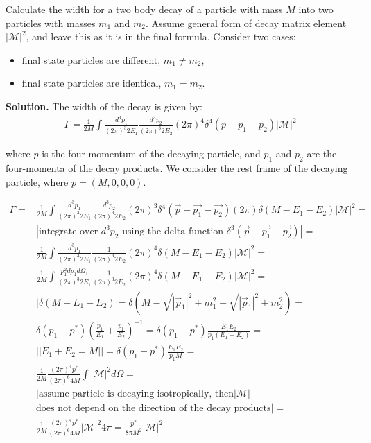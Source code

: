 \documentclass[11pt,a4paper]{article}
\newenvironment{solution}{\vspace{1cm} \par\textbf{Solution.} \vspace{1cm}}{\newpage}
\begin{document}
Calculate the width for a two body decay of a particle with mass $M$ into two 
particles with masses $m_1$ and $m_2$. Assume general form of decay matrix element 
$|\mathcal{M}|^2$, and leave this as it is in the final formula. 
Consider two cases:
\begin{itemize}
  \item final state particles are different, $m_1 \neq m_2$,
  \item final state particles are identical, $m_1 = m_2$.
\end{itemize}

\begin{solution}
  The width of the decay is given by:
  \begin{align*}
    \Gamma = \frac{1}{2M} \int \frac{d^3p_1}{(2\pi)^3 2E_1} \frac{d^3p_2}{(2\pi)^3 2E_2} (2\pi)^4 \delta^4(p - p_1 - p_2) |\mathcal{M}|^2
  \end{align*}
  
  where $p$ is the four-momentum of the decaying particle, and $p_1$ and $p_2$ are the four-momenta of the decay products.
  We consider the rest frame of the decaying particle, where $p = (M, 0, 0, 0)$.

  \begin{align*}
    \Gamma = & \frac{1}{2M} \int \frac{d^3p_1}{(2\pi)^3 2E_1} \frac{d^3p_2}{(2\pi)^3 2E_2} (2\pi)^3 \delta^4(\vec{p} - \vec{p_1} - \vec{p_2}) 
    (2\pi) \delta(M - E_1 - E_2) |\mathcal{M}|^2 = \\
    & | \text{integrate over } d^3p_2 \text{ using the delta function } \delta^3(\vec{p} - \vec{p_1} - \vec{p_2}) | = \\
    & \frac{1}{2M} \int \frac{d^3p_1}{(2\pi)^3 2E_1} \frac{1}{(2\pi)^3 2E_2} (2\pi)^4 \delta(M - E_1 - E_2) |\mathcal{M}|^2 = \\
    & \frac{1}{2M} \int \frac{p_{1}^{2}dp_1 d\Omega_1}{(2\pi)^3 2E_1} \frac{1}{(2\pi)^3 2E_2} (2\pi)^4 \delta(M - E_1 - E_2) |\mathcal{M}|^2 = \\
    & | \delta(M - E_1 - E_2) = \delta(M - \sqrt{|\vec{p}_1|^2 + m_1^2} + \sqrt{|\vec{p}_1|^2 + m_2^2}) =  \\
    & \delta(p_{1} - p^{*}) \left( \frac{p_{1}}{E_{1}} + \frac{p_{1}}{E_{2}} \right)^{-1} = 
      \delta(p_{1} - p^{*}) \frac{E_{1} E_{2}}{p_{1} (E_{1} + E_{2})} = \\
    & || E_1 + E_2 = M || = 
     \delta(p_{1} - p^{*}) \frac{E_{1} E_{2}}{p_{1} M} =  \\
    & \frac{1}{2M} \frac{(2\pi)^4 p^{*}}{(2\pi)^6 4M} \int  |\mathcal{M}|^2 d\Omega = \\
    & | \text{assume particle is decaying isotropically, then} |\mathcal{M}| \\
    & \text{does not depend on the direction of the decay products} | = \\
    &\frac{1}{2M} \frac{(2\pi)^4 p^{*}}{(2\pi)^6 4M} |\mathcal{M}|^2 4\pi = 
     \frac{p^{*}}{8\pi M^2} |\mathcal{M}|^2
  \end{align*}


\end{solution}
\end{document}
